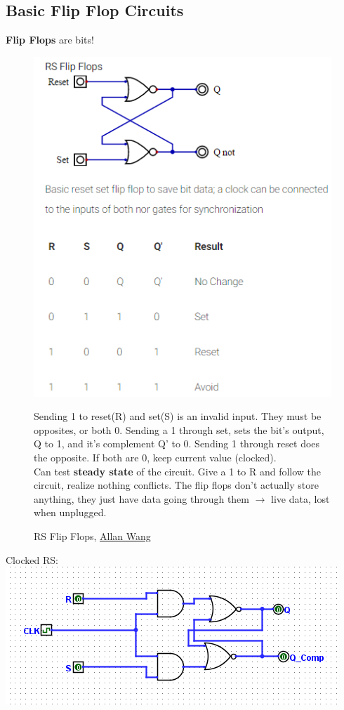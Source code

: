 \documentclass[12 pt]{article}
\begin{document}
	\subsection{Basic Flip Flop Circuits}
	\textbf{Flip Flops} are bits!
	\begin{figure}[H]
		\caption{RS Flip Flops, \href{https://www.allanwang.ca/notes/mcgill/comp273/0.php}{Allan Wang}}
		\begin{center}
			\includegraphics{rsf}
		\end{center}
		Sending 1 to reset(R) and set(S) is an invalid input. They must be opposites, or both 0. Sending a 1 through set, sets the bit's output, Q to 1, and it's complement Q' to 0. Sending 1 through reset does the opposite. If both are 0, keep current value (clocked).
		\\ Can test \textbf{steady state} of the circuit. Give a 1 to R and follow the circuit, realize nothing conflicts. The flip flops don't actually store anything, they just have data going through them $\to$ live data, lost when unplugged.
	\end{figure}
	Clocked RS: \includegraphics{clksr}
\end{document}
